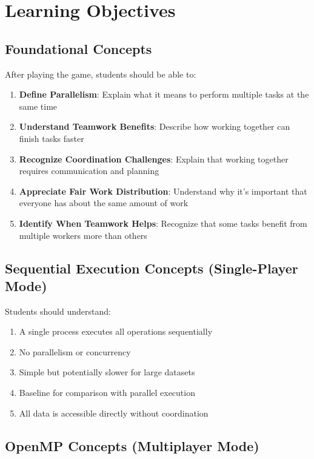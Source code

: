 \section{Learning Objectives}
\label{app:d:learning-objectives}

\subsection{Foundational Concepts}

After playing the game, students should be able to:

\begin{enumerate}
    \item \textbf{Define Parallelism}: Explain what it means to perform multiple tasks at the same time
    \item \textbf{Understand Teamwork Benefits}: Describe how working together can finish tasks faster
    \item \textbf{Recognize Coordination Challenges}: Explain that working together requires communication and planning
    \item \textbf{Appreciate Fair Work Distribution}: Understand why it's important that everyone has about the same amount of work
    \item \textbf{Identify When Teamwork Helps}: Recognize that some tasks benefit from multiple workers more than others
\end{enumerate}

\subsection{Sequential Execution Concepts (Single-Player Mode)}

Students should understand:

\begin{enumerate}
    \item A single process executes all operations sequentially
    \item No parallelism or concurrency
    \item Simple but potentially slower for large datasets
    \item Baseline for comparison with parallel execution
    \item All data is accessible directly without coordination
\end{enumerate}

\subsection{OpenMP Concepts (Multiplayer Mode)}


